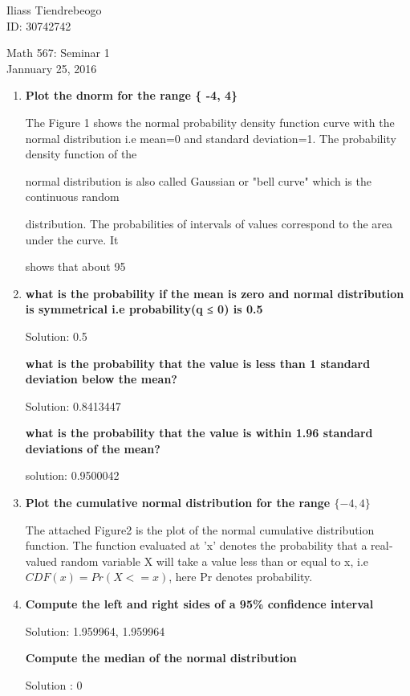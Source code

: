 \documentclass{article}[14pt]
\begin{document}
\hfill Iliass Tiendrebeogo\\

\hfill ID: 30742742 \\

\bigskip

\begin{center}
  \begin{Large}
    Math 567: Seminar 1\\
    Jannuary 25, 2016\\
   
  \end{Large}
\end{center} 


\begin{enumerate}[1.]
\item  %
{\bf \large Plot the dnorm for the range \{ -4, 4\} }


The Figure 1 shows the normal probability density function curve with the normal distribution i.e mean=0 and standard deviation=1. The probability density function of the

normal distribution is also called Gaussian or "bell curve" which is the continuous random

distribution. The probabilities of intervals of values correspond to the area under the curve. It

shows that about 95%
\item %
{\bf \large what is the probability if the mean is zero and normal distribution is symmetrical i.e probability(q ≤ 0) is 0.5 }

 Solution: 0.5

{\bf \large what is the probability that the value is less than 1 standard deviation below the mean?}

Solution: 0.8413447
 
\medspace

{\bf \large what is the probability that the value is within 1.96 standard deviations of the mean?}
 
 solution: 0.9500042

\item %
 { \bf \large Plot the cumulative normal distribution for the range $\{ -4, 4\}$ }
 
 The attached Figure2 is the plot of the normal cumulative distribution function. The function evaluated at 'x' denotes the probability that a real­valued random variable X will take a value less than or equal to x, i.e $CDF(x) = Pr(X<=x)$, here Pr denotes probability.
\item %
 {\bf \large Compute the left and right sides of a 95\% confidence interval}

Solution: 1.959964, ­1.959964

 {\bf \large Compute the median of the normal distribution}

Solution : 0

\end{enumerate}
\end{document}
